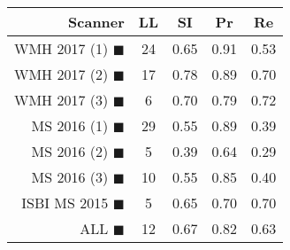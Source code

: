 \begin{tabular}{rcccc}
\toprule
Scanner & LL & SI & Pr & Re \\
\midrule
WMH 2017 (1) {\color[rgb]{ 1.00 0.00 0.00}$\blacksquare$} & 24 & 0.65 & 0.91 & 0.53 \\
WMH 2017 (2) {\color[rgb]{ 1.00 0.50 0.00}$\blacksquare$} & 17 & 0.78 & 0.89 & 0.70 \\
WMH 2017 (3) {\color[rgb]{ 1.00 0.80 0.00}$\blacksquare$} & 6 & 0.70 & 0.79 & 0.72 \\
MS  2016 (1) {\color[rgb]{ 0.20 0.80 0.00}$\blacksquare$} & 29 & 0.55 & 0.89 & 0.39 \\
MS  2016 (2) {\color[rgb]{ 0.00 0.40 1.00}$\blacksquare$} & 5 & 0.39 & 0.64 & 0.29 \\
MS  2016 (3) {\color[rgb]{ 0.60 0.00 1.00}$\blacksquare$} & 10 & 0.55 & 0.85 & 0.40 \\
ISBI MS 2015 {\color[rgb]{ 1.00 0.00 1.00}$\blacksquare$} & 5 & 0.65 & 0.70 & 0.70 \\
\midrule
ALL {\color[rgb]{ 1.00 1.00 1.00}$\blacksquare$} & 12 & 0.67 & 0.82 & 0.63 \\
\bottomrule
\end{tabular}